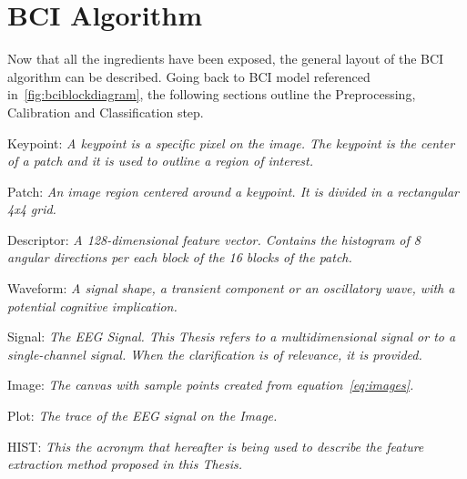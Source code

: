 \section{BCI Algorithm}

Now that all the ingredients have been exposed, the general layout of the BCI algorithm can be described.  Going back to BCI model referenced in~\ref{fig:bciblockdiagram}, the following sections outline the Preprocessing, Calibration and Classification step.

\begin{story}
\theoremstyle{definition}

\begin{definition}{Keypoint:}
\label{def:Keypoint}
\textit{A keypoint is a specific pixel on the image.  The keypoint is the center of a patch and it is used to outline a region of interest.}
\end{definition}

\begin{definition}{Patch:}
\label{def:Patch}
\textit{An image region centered around a keypoint.  It is divided in a rectangular 4x4 grid.}
\end{definition}

\begin{definition}{Descriptor:}
\label{def:Descriptor}
\textit{A 128-dimensional \textit{feature} vector.  Contains the histogram of 8 angular directions per each block of the 16 blocks of the patch.}
\end{definition}

\begin{definition}{Waveform:}
\label{def:Waveform}
\textit{A signal shape, a transient component or an oscillatory wave, with a potential cognitive implication.}
\end{definition}

\begin{definition}{Signal:}
\label{def:Signal}
\textit{The EEG Signal. This Thesis refers to a multidimensional signal or to a single-channel signal. When the clarification is of relevance, it is provided.}
\end{definition}

\begin{definition}{Image:}
\label{def:Image}
\textit{The \textit{canvas} with sample points created from equation~\ref{eq:images}.}
\end{definition}

\begin{definition}{Plot:}
\label{def:Plot}
\textit{The trace of the EEG signal on the Image.}
\end{definition}

\begin{definition}{HIST:}
\label{def:Plot}
\textit{This the acronym that hereafter is being used to describe the feature extraction method proposed in this Thesis.}
\end{definition}

\end{story}

